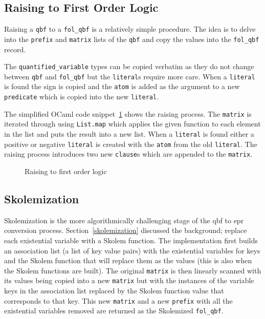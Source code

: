 \subsection{Raising to First Order Logic}
Raising a \texttt{qbf} to a \texttt{fol\_qbf} is a relatively simple procedure. The idea is to delve into the \texttt{prefix} and \texttt{matrix} lists of the \texttt{qbf} and copy the values into the \texttt{fol\_qbf} record.

The \texttt{quantified\_variable} types can be copied verbatim as they do not change between \texttt{qbf} and \texttt{fol\_qbf} but the \texttt{literal}s require more care. When a \texttt{literal} is found the sign is copied and the \texttt{atom} is added as the argument to a new \texttt{predicate} which is copied into the new \texttt{literal}.

The simplified OCaml code snippet~\ref{raisetofol} shows the raising process. The \texttt{matrix} is iterated through using \texttt{List.map} which applies the given function to each element in the list and puts the result into a new list. When a \texttt{literal} is found either a positive or negative \texttt{literal} is created with the \texttt{atom} from the old \texttt{literal}. The raising process introduces two new \texttt{clause}s which are appended to the \texttt{matrix}.

\begin{figure}[H]
\caption{Raising to first order logic}
\label{raisetofol}
\begin{CenteredBox}

\end{CenteredBox}
\end{figure}

\subsection{Skolemization}
Skolemization is the more algorithmically challenging stage of the \gls{qbf} to \gls{epr} conversion process. Section~\ref{skolemization} discussed the background; replace each existential variable with a Skolem function. The implementation first builds an association list (a list of key value pairs) with the existential variables for keys and the Skolem function that will replace them as the values (this is also when the Skolem functions are built). The original \texttt{matrix} is then linearly scanned with its values being copied into a new \texttt{matrix} but with the instances of the variable keys in the association list replaced by the Skolem function value that corresponds to that key. This new \texttt{matrix} and a new \texttt{prefix} with all the existential variables removed are returned as the Skolemized \texttt{fol\_qbf}.

